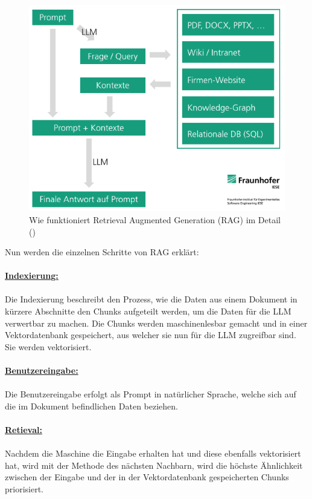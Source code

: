\documentclass[12pt,toc=bib,toc=listof]{scrreprt}
\begin{document}
\begin{figure} [H]
    \centering
    \includegraphics[width=0.75\linewidth]{./Bilder/Honroth_Wie funktioniert Retrieval Augmented Generation (RAG) im Detail.png}
    \caption{Wie funktioniert Retrieval Augmented Generation (RAG) im Detail (\cite{Honroth2024})}
    \label{fig:enter-label}
\end{figure}
\noindent Nun werden die einzelnen Schritte von RAG erklärt:\\
\\
\textbf{\underline{Indexierung:}}\\
\\
Die Indexierung beschreibt den Prozess, wie die Daten aus einem Dokument in kürzere Abschnitte den Chunks aufgeteilt werden, um die Daten für die LLM verwertbar zu machen. Die Chunks werden maschinenlesbar gemacht und in einer Vektordatenbank gespeichert, aus welcher sie nun für die LLM zugreifbar sind. Sie werden vektorisiert.\\
\\
\textbf{\underline{Benutzereingabe:}}\\
\\
Die Benutzereingabe erfolgt als Prompt in natürlicher Sprache, welche sich auf die im Dokument befindlichen Daten beziehen.\\
\\
\textbf{\underline{Retieval:}}\\
\\
Nachdem die Maschine die Eingabe erhalten hat und diese ebenfalls vektorisiert hat, wird mit der Methode des nächsten Nachbarn, wird die höchste Ähnlichkeit zwischen der Eingabe und der in der Vektordatenbank gespeicherten Chunks priorisiert.\\
\\
\end{document}
